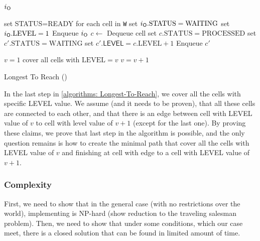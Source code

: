\documentclass[a4paper,11pt]{article}
\theoremstyle{definition}
\newcommand{\opp}{{{\sf O}}\xspace}
\newcommand{\w}{{{\texttt W}}\xspace}
\newcommand{\ltr}{{{\sf{LTR}}}\xspace}
\begin{document}
{\small{
\begin{algorithm}
\begin{algorithmic}
    \REQUIRE $i_\opp$
    
   \STATE set STATUS=READY for each cell in \w
   \STATE set $i_\opp.\text{STATUS}=\text{WAITING}$
   \STATE set $i_\opp.\text{LEVEL}=1$
   \STATE Enqueue $i_\opp$
        \STATE $c\leftarrow$ Dequeue cell
        \STATE set $c.\text{STATUS}=\text{PROCESSED}$
                \STATE set $c'.\text{STATUS}=\text{WAITING}$
                \STATE set $c'.\textsf{LEVEL}=c.\text{LEVEL}+1$
                \STATE Enqueue $c'$
            \ENDIF
        \ENDFOR
    \ENDWHILE
   
    
    \STATE $v=1$
    \WHILE{$\exists c\in \w$ s.t. $c.\text{LEVEL}=v$}
        \STATE cover all cells with $\text{LEVEL}=v$
        \STATE $v=v+1$
    \ENDWHILE
    
    
\end{algorithmic}
\caption{Longest To Reach (\ltr)\label{algorithms: Longest-To-Reach}}
\end{algorithm}
}}

In the last step in \ref{algorithms: Longest-To-Reach}, we cover all the cells with specific LEVEL value. We assume (and it needs to be proven), that all these cells are connected to each other, and that there is an edge between cell with LEVEL value of $v$ to cell with level value of $v+1$ (except for the last one). By proving these claims, we prove that last step in the algorithm is possible, and the only question remains is how to create the minimal path that cover all the cells with LEVEL value of $v$ and finishing at cell with edge to a cell with LEVEL value of $v+1$.

\subsubsection{\ltr Complexity}
First, we need to show that in the general case (with no restrictions over the world), implementing \ltr is NP-hard (show reduction to the traveling salesman problem).
Then, we need to show that under some conditions, which our case meet, there is a closed solution that can be found in limited amount of time.
\end{document}
